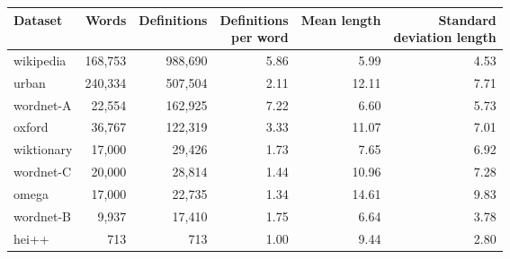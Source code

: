 \begin{tabular}{|l|rr|rrr|}
    \hline
    Dataset    & Words   & Definitions & \makecell[r]{Definitions                \\ per word}  & Mean length & \makecell[r]{Standard \\ deviation length} \\
    \hline
    wikipedia  & 168,753 & 988,690     & 5.86                     & 5.99  & 4.53 \\
    urban      & 240,334 & 507,504     & 2.11                     & 12.11 & 7.71 \\
    wordnet-A  & 22,554  & 162,925     & 7.22                     & 6.60  & 5.73 \\
    oxford     & 36,767  & 122,319     & 3.33                     & 11.07 & 7.01 \\
    wiktionary & 17,000  & 29,426      & 1.73                     & 7.65  & 6.92 \\
    wordnet-C  & 20,000  & 28,814      & 1.44                     & 10.96 & 7.28 \\
    omega      & 17,000  & 22,735      & 1.34                     & 14.61 & 9.83 \\
    wordnet-B  & 9,937   & 17,410      & 1.75                     & 6.64  & 3.78 \\
    hei++      & 713     & 713         & 1.00                     & 9.44  & 2.80 \\
    \hline
\end{tabular}
